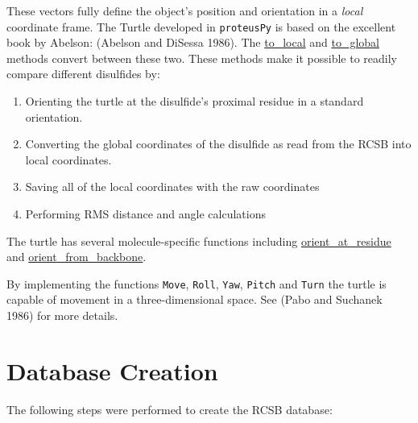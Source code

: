 These vectors fully define the object's position and orientation in a
\emph{local} coordinate frame. The Turtle developed in
\texttt{proteusPy} is based on the excellent book by Abelson: (Abelson
and DiSessa 1986). The
\href{\%22https://suchanek.github.io/proteusPy/proteusPy/turtle3D.html\#Turtle3D.to_local\%22}{to\_local}
and
\href{\%22https://suchanek.github.io/proteusPy/proteusPy/turtle3D.html\#Turtle3D.to_global\%22}{to\_global}
methods convert between these two. These methods make it possible to
readily compare different disulfides by:

\begin{enumerate}
\def\labelenumi{\arabic{enumi}.}
\tightlist
\item
  Orienting the turtle at the disulfide's proximal residue in a standard
  orientation.
\item
  Converting the global coordinates of the disulfide as read from the
  RCSB into local coordinates.
\item
  Saving all of the local coordinates with the raw coordinates
\item
  Performing RMS distance and angle calculations
\end{enumerate}

The turtle has several molecule-specific functions including
\href{\%22https://suchanek.github.io/proteusPy/proteusPy/turtle3D.html\#Turtle3D.orient_at_residue\%22}{orient\_at\_residue}
and
\href{\%22https://suchanek.github.io/proteusPy/proteusPy/turtle3D.html\#Turtle3D.orient_from_backbone\%22}{orient\_from\_backbone}.

By implementing the functions \texttt{Move}, \texttt{Roll},
\texttt{Yaw}, \texttt{Pitch} and \texttt{Turn} the turtle is capable of
movement in a three-dimensional space. See (Pabo and Suchanek 1986) for
more details.

\hypertarget{database-creation}{%
\section{Database Creation}\label{database-creation}}

The following steps were performed to create the RCSB database:

